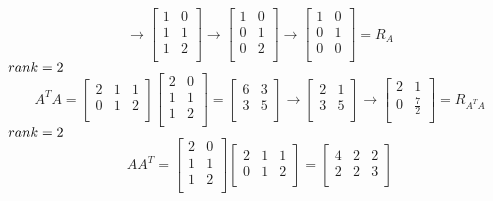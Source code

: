 \documentclass[10pt,twoside,reqno]{article}
\begin{document}
\begin{enumerate}
$$\rightarrow
\begin{bmatrix}
1&0\\
1&1\\
1&2\\
\end{bmatrix}
\rightarrow 
\begin{bmatrix}
1&0\\
0&1\\
0&2\\
\end{bmatrix}
\rightarrow 
\begin{bmatrix}
1&0\\
0&1\\
0&0\\
\end{bmatrix}
= R_A
$$
$ rank = 2\\
$
$$
A^TA = 
\begin{bmatrix}
2&1&1\\
0&1&2\\
\end{bmatrix}
\begin{bmatrix}
2&0\\
1&1\\
1&2\\
\end{bmatrix}
=
\begin{bmatrix}
6&3\\
3&5\\
\end{bmatrix}
\rightarrow
\begin{bmatrix}
2&1\\
3&5\\
\end{bmatrix}
\rightarrow
\begin{bmatrix}
2&1\\
0&\frac{7}{2}\\
\end{bmatrix}
= R_{A^TA}
$$
$ rank = 2\\
$
$$
AA^T = 
\begin{bmatrix}
2&0\\
1&1\\
1&2\\
\end{bmatrix}
\begin{bmatrix}
2&1&1\\
0&1&2\\
\end{bmatrix}
=
\begin{bmatrix}
4&2&2\\
2&2&3\\

\end{bmatrix}$$
\end{enumerate}
\end{document}
